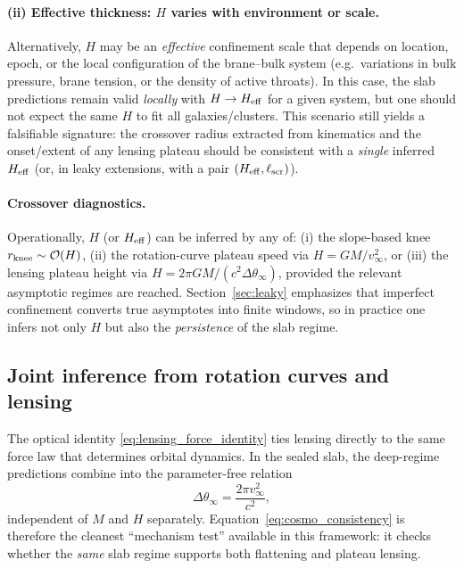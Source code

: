 \documentclass[11pt]{article}
\begin{document}
\paragraph{(ii) Effective thickness: $H$ varies with environment or scale.}
Alternatively, $H$ may be an \emph{effective} confinement scale that depends on location, epoch, or
the local configuration of the brane--bulk system (e.g.\ variations in bulk pressure, brane tension,
or the density of active throats).
In this case, the slab predictions remain valid \emph{locally} with $H\to H_{\rm eff}$ for a given
system, but one should not expect the same $H$ to fit all galaxies/clusters.
This scenario still yields a falsifiable signature: the crossover radius extracted from kinematics
and the onset/extent of any lensing plateau should be consistent with a \emph{single} inferred
$H_{\rm eff}$ (or, in leaky extensions, with a pair $(H_{\rm eff},\ell_{\rm scr})$).

\paragraph{Crossover diagnostics.}
Operationally, $H$ (or $H_{\rm eff}$) can be inferred by any of:
(i) the slope-based knee $r_{\rm knee}\sim \mathcal{O}(H)$,
(ii) the rotation-curve plateau speed via $H=GM/v_\infty^2$, or
(iii) the lensing plateau height via $H=2\pi GM/(c^2\Delta\theta_\infty)$,
provided the relevant asymptotic regimes are reached.
Section~\ref{sec:leaky} emphasizes that imperfect confinement converts true asymptotes into finite
windows, so in practice one infers not only $H$ but also the \emph{persistence} of the slab regime.

\subsection{Joint inference from rotation curves and lensing}
\label{sec:cosmo_joint}

The optical identity \eqref{eq:lensing_force_identity} ties lensing directly to the same force law
that determines orbital dynamics.  In the sealed slab, the deep-regime predictions combine into the
parameter-free relation
\begin{equation}
  \Delta\theta_\infty = \frac{2\pi v_\infty^2}{c^2},
  \label{eq:cosmo_consistency}
\end{equation}
independent of $M$ and $H$ separately.  Equation~\eqref{eq:cosmo_consistency} is therefore the
cleanest ``mechanism test'' available in this framework: it checks whether the \emph{same} slab
regime supports both flattening and plateau lensing.
\end{document}
